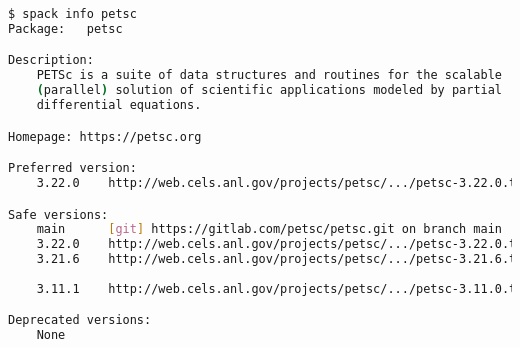 \small{
\begin{lstlisting}[language=bash]
$ spack info petsc
Package:   petsc

Description:
    PETSc is a suite of data structures and routines for the scalable
    (parallel) solution of scientific applications modeled by partial
    differential equations.

Homepage: https://petsc.org

Preferred version:  
    3.22.0    http://web.cels.anl.gov/projects/petsc/.../petsc-3.22.0.tar.gz

Safe versions:  
    main      [git] https://gitlab.com/petsc/petsc.git on branch main
    3.22.0    http://web.cels.anl.gov/projects/petsc/.../petsc-3.22.0.tar.gz
    3.21.6    http://web.cels.anl.gov/projects/petsc/.../petsc-3.21.6.tar.gz
    
    3.11.1    http://web.cels.anl.gov/projects/petsc/.../petsc-3.11.0.tar.gz

Deprecated versions:  
    None


\end{lstlisting}}
